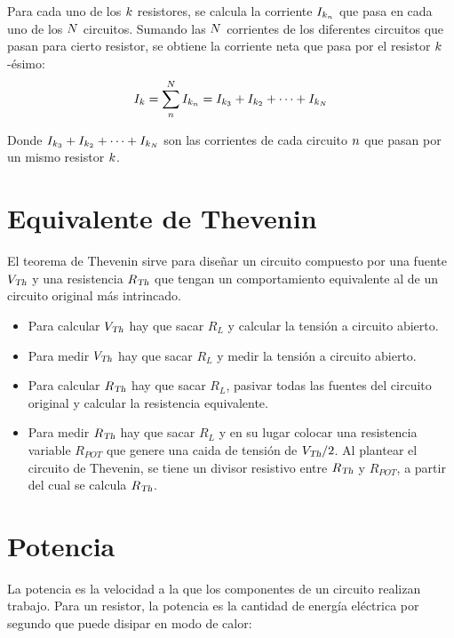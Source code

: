 Para cada uno de los $k$ resistores, se calcula la corriente $I_{k_n}$ que pasa en cada uno de los $N$ circuitos.
Sumando las $N$ corrientes de los diferentes circuitos que pasan para cierto resistor, se obtiene la corriente neta que pasa por el resistor $k$-ésimo:
\begin{equation*}
    I_k = \sum_n^N I_{k_n} = I_{k_3} + I_{k_2} + \dots + I_{k_N}
\end{equation*}

Donde $I_{k_3} + I_{k_2} + \dots + I_{k_N}$ son las corrientes de cada circuito $n$ que pasan por un mismo resistor $k$.


\section{Equivalente de Thevenin}

El teorema de Thevenin sirve para diseñar un circuito compuesto por una fuente ${{V}_\textsl{{Th}}}$ y una resistencia ${{R}_\textsl{{Th}}}$ que tengan un comportamiento equivalente al de un circuito original más intrincado.

\begin{itemize}
\item Para calcular ${{V}_\textsl{{Th}}}$ hay que sacar $R_L$ y calcular la tensión a circuito abierto.
\item Para medir ${{V}_\textsl{{Th}}}$ hay que sacar $R_L$ y medir la tensión a circuito abierto.
\item Para calcular ${{R}_\textsl{{Th}}}$ hay que sacar $R_L$, pasivar todas las fuentes del circuito original y calcular la resistencia equivalente.
\item Para medir ${{R}_\textsl{{Th}}}$ hay que sacar $R_L$ y en su lugar colocar una resistencia variable $R_{POT}$ que genere una caida de tensión de ${{V}_\textsl{{Th}}}/2$.
Al plantear el circuito de Thevenin, se tiene un divisor resistivo entre ${{R}_\textsl{{Th}}}$ y $R_{POT}$, a partir del cual se calcula ${{R}_\textsl{{Th}}}$.
\end{itemize}


\section{Potencia}

La potencia es la velocidad a la que los componentes de un circuito realizan trabajo.
Para un resistor, la potencia es la cantidad de energía eléctrica por segundo que puede disipar en modo de calor:

